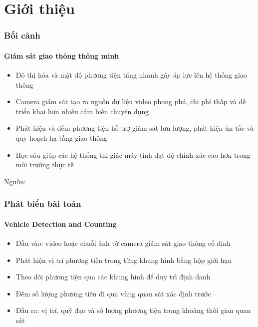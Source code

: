 \section{Giới thiệu}

\begin{frame}
\frametitle{Bối cảnh}
\framesubtitle{Giám sát giao thông thông minh}

\begin{itemize}[<+->]
  \item Đô thị hóa và mật độ phương tiện tăng nhanh gây áp lực lên hệ thống
        giao thông
  \item Camera giám sát tạo ra nguồn dữ liệu video phong phú, chi phí thấp và
        dễ triển khai hơn nhiều cảm biến chuyên dụng
  \item Phát hiện và đếm phương tiện hỗ trợ giám sát lưu lượng, phát hiện ùn
        tắc và quy hoạch hạ tầng giao thông
  \item Học sâu giúp các hệ thống thị giác máy tính đạt độ chính xác cao hơn
        trong môi trường thực tế
\end{itemize}

\vspace{0.2cm}

{\scriptsize Nguồn: \cite{YANG2018143,song2019}}

\end{frame}

\begin{frame}
\frametitle{Phát biểu bài toán}
\framesubtitle{Vehicle Detection and Counting}

\begin{itemize}[<+->]
  \item Đầu vào: video hoặc chuỗi ảnh từ camera giám sát giao thông cố định
  \item Phát hiện vị trí phương tiện trong từng khung hình bằng hộp giới hạn
  \item Theo dõi phương tiện qua các khung hình để duy trì định danh
  \item Đếm số lượng phương tiện đi qua vùng quan sát xác định trước
  \item Đầu ra: vị trí, quỹ đạo và số lượng phương tiện trong khoảng thời gian
        quan sát
\end{itemize}

\end{frame}

